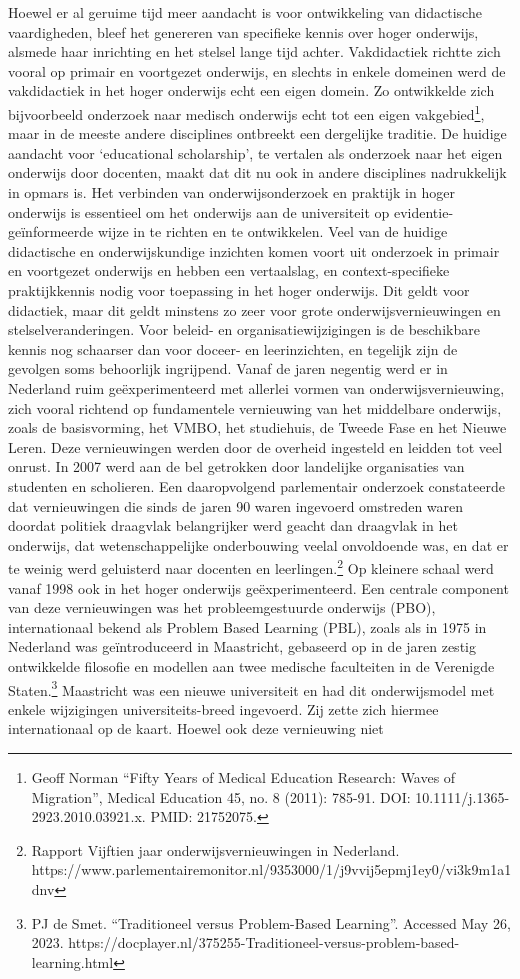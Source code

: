 \documentclass{jote-book}
\begin{document}
	Hoewel er al geruime tijd meer aandacht is voor ontwikkeling van didactische vaardigheden, bleef het genereren van specifieke kennis over hoger onderwijs, alsmede haar inrichting en het stelsel lange tijd achter. Vakdidactiek richtte zich vooral op primair en voortgezet onderwijs, en slechts in enkele domeinen werd de vakdidactiek in het hoger onderwijs echt een eigen domein. Zo ontwikkelde zich bijvoorbeeld onderzoek naar medisch onderwijs echt tot een eigen vakgebied\footnote{Geoff Norman “Fifty Years of Medical Education Research: Waves of Migration”, Medical Education 45, no. 8 (2011): 785-91. DOI: 10.1111/j.1365-2923.2010.03921.x. PMID: 21752075.}, maar in de meeste andere disciplines ontbreekt een dergelijke traditie. De huidige aandacht voor ‘educational scholarship', te vertalen als onderzoek naar het eigen onderwijs door docenten, maakt dat dit nu ook in andere disciplines nadrukkelijk in opmars is. Het verbinden van onderwijsonderzoek en praktijk in hoger onderwijs is essentieel om het onderwijs aan de universiteit op evidentie-geïnformeerde wijze in te richten en te ontwikkelen. Veel van de huidige didactische en onderwijskundige inzichten komen voort uit onderzoek in primair en voortgezet onderwijs en hebben een vertaalslag, en context-specifieke praktijkkennis nodig voor toepassing in het hoger onderwijs. Dit geldt voor didactiek, maar dit geldt minstens zo zeer voor grote onderwijsvernieuwingen en stelselveranderingen. Voor beleid- en organisatiewijzigingen is de beschikbare kennis nog schaarser dan voor doceer- en leerinzichten, en tegelijk zijn de gevolgen soms behoorlijk ingrijpend. Vanaf de jaren negentig werd er in Nederland ruim geëxperimenteerd met allerlei vormen van onderwijsvernieuwing, zich vooral richtend op fundamentele vernieuwing van het middelbare onderwijs, zoals de basisvorming, het VMBO, het studiehuis, de Tweede Fase en het Nieuwe Leren. Deze vernieuwingen werden door de overheid ingesteld en leidden tot veel onrust. In 2007 werd aan de bel getrokken door landelijke organisaties van studenten en scholieren. Een daaropvolgend parlementair onderzoek constateerde dat vernieuwingen die sinds de jaren 90 waren ingevoerd omstreden waren doordat politiek draagvlak belangrijker werd geacht dan draagvlak in het onderwijs, dat wetenschappelijke onderbouwing veelal onvoldoende was, en dat er te weinig werd geluisterd naar docenten en leerlingen.\footnote{Rapport Vijftien jaar onderwijsvernieuwingen in Nederland. https://www.parlementairemonitor.nl/9353000/1/j9vvij5epmj1ey0/vi3k9m1a1dnv} Op kleinere schaal werd vanaf 1998 ook in het hoger onderwijs geëxperimenteerd. Een centrale component van deze vernieuwingen was het probleemgestuurde onderwijs (PBO), internationaal bekend als Problem Based Learning (PBL), zoals als in 1975 in Nederland was geïntroduceerd in Maastricht, gebaseerd op in de jaren zestig ontwikkelde filosofie en modellen aan twee medische faculteiten in de Verenigde Staten.\footnote{PJ de Smet. “Traditioneel versus Problem-Based Learning”. Accessed May 26, 2023. https://docplayer.nl/375255-Traditioneel-versus-problem-based-learning.html} Maastricht was een nieuwe universiteit en had dit onderwijsmodel met enkele wijzigingen universiteits-breed ingevoerd. Zij zette zich hiermee internationaal op de kaart. Hoewel ook deze vernieuwing niet 
\end{document}
